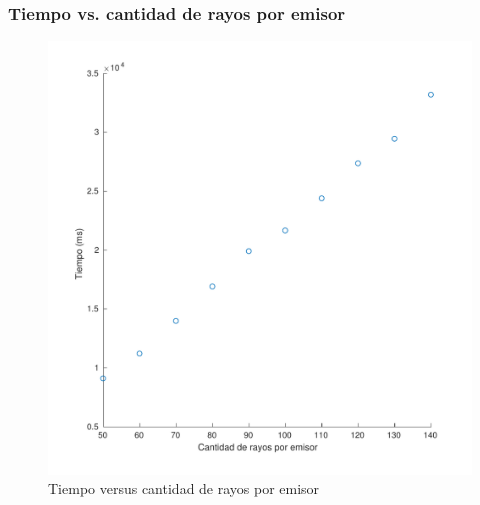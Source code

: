 \documentclass[11pt]{beamer}
\begin{document}
\begin{frame}
    \frametitle{Tiempo vs. cantidad de rayos por emisor}
    \begin{figure}[H]
        \centering
            
                \includegraphics[scale=0.45]{img/cantrayos_tiempo-eps-converted-to.pdf}
                \caption{Tiempo versus cantidad de rayos por emisor}
                \label{fig:tiempo versus cantrayos}
            
    \end{figure}
\end{frame}
\end{document}
